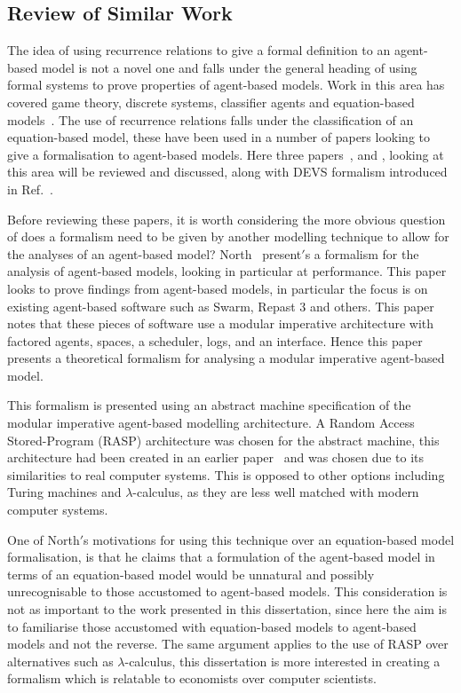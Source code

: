 \documentclass{article}
\begin{document}
\subsection{Review of Similar Work}\label{simwork}
The idea of using recurrence relations to give a formal definition to an agent-based model is not a novel one and falls under the general heading of using formal systems to prove properties of agent-based models. Work in this area has covered game theory, discrete systems, classifier agents and equation-based models~\cite{taabm}. The use of recurrence relations falls under the classification of an equation-based model, these have been used in a number of papers looking to give a formalisation to agent-based models. Here three papers~\cite{ebmabmi}, \cite{econmistsnoabm} and \cite{abmtsd}, looking at this area will be reviewed and discussed, along with DEVS formalism introduced in Ref.~\cite{introdevs}.

Before reviewing these papers, it is worth considering the more obvious question of does a formalism need to be given by another modelling technique to allow for the analyses of an agent-based model? North~\cite{taabm} present$'$s a formalism for the analysis of agent-based models, looking in particular at performance. This paper looks to prove findings from agent-based models, in particular the focus is on existing agent-based software such as Swarm, Repast 3 and others. This paper notes that these pieces of software use a modular imperative architecture with factored agents, spaces, a scheduler, logs, and an interface. Hence this paper presents a theoretical formalism for analysing a modular imperative agent-based model.    

This formalism is presented using an abstract machine specification of the modular imperative agent-based modelling architecture. A  Random Access Stored-Program (RASP) architecture was chosen for the abstract machine, this architecture had been created in an earlier paper~\cite{raspceated} and was chosen due to its similarities to real computer systems. This is opposed to other options including Turing machines and $\lambda$-calculus, as they are less well matched with modern computer systems.     

One of North$'$s motivations for using this technique over an equation-based model formalisation, is that he claims that a formulation of the agent-based model in terms of an equation-based model would be unnatural and possibly unrecognisable to those accustomed to agent-based models. This consideration is not as important to the work presented in this dissertation, since here the aim is to familiarise those accustomed with equation-based models to agent-based models and not the reverse. The same argument applies to the use of RASP over alternatives such as $\lambda$-calculus, this dissertation is more interested in creating a formalism which is relatable to economists over computer scientists.   
\end{document}
